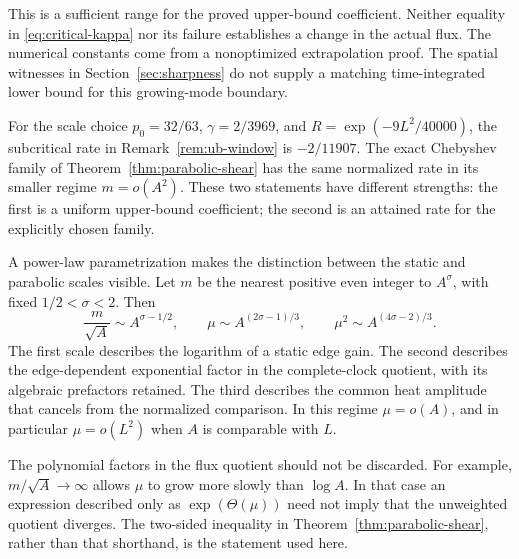 This is a sufficient range for the proved upper-bound coefficient.
Neither equality in \eqref{eq:critical-kappa} nor its failure establishes
a change in the actual flux. The numerical constants come from a
nonoptimized extrapolation proof. The spatial witnesses in
Section~\ref{sec:sharpness} do not supply a matching time-integrated
lower bound for this growing-mode boundary.

For the scale choice
\(p_0=32/63\), \(\gamma=2/3969\), and
\(R=\exp(-9L^2/40000)\), the subcritical rate in
Remark~\ref{rem:ub-window} is \(-2/11907\). The exact Chebyshev family
of Theorem~\ref{thm:parabolic-shear} has the same normalized rate in
its smaller regime \(m=o(A^2)\). These two statements have different
strengths: the first is a uniform upper-bound coefficient; the second
is an attained rate for the explicitly chosen family.

A power-law parametrization makes the distinction between the static
and parabolic scales visible. Let \(m\) be the nearest positive even
integer to \(A^\sigma\), with fixed \(1/2<\sigma<2\). Then
\begin{equation}\label{eq:power-law-regimes}
 \frac{m}{\sqrt A}\sim A^{\sigma-1/2},\qquad
 \mu\sim A^{(2\sigma-1)/3},\qquad
 \mu^2\sim A^{(4\sigma-2)/3}.
\end{equation}
The first scale describes the logarithm of a static edge gain.
The second describes the edge-dependent exponential factor in the
complete-clock quotient, with its algebraic prefactors retained.
The third describes the common heat amplitude that cancels from the
normalized comparison. In this regime \(\mu=o(A)\), and in particular
\(\mu=o(L^2)\) when \(A\) is comparable with \(L\).

The polynomial factors in the flux quotient should not be discarded.
For example, \(m/\sqrt A\to\infty\) allows \(\mu\) to grow more slowly
than \(\log A\). In that case an expression described only as
\(\exp(\Theta(\mu))\) need not imply that the unweighted quotient
diverges. The two-sided inequality in
Theorem~\ref{thm:parabolic-shear}, rather than that shorthand, is the
statement used here.

